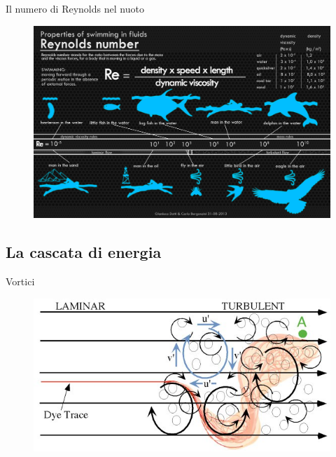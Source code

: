 \documentclass[11pt]{beamer}
\begin{document}
\begin{frame}{Il numero di Reynolds nel nuoto}
\begin{figure}
\centering
\includegraphics[scale=0.12]{infographic.jpg}
\end{figure}
\end{frame}

\subsection{La cascata di energia}

\begin{frame}{Vortici}
\begin{figure}
\centering
\includegraphics[scale=0.4]{Airplane_Turbulence_MIT.jpg}
\end{figure}
\end{frame}
\end{document}
